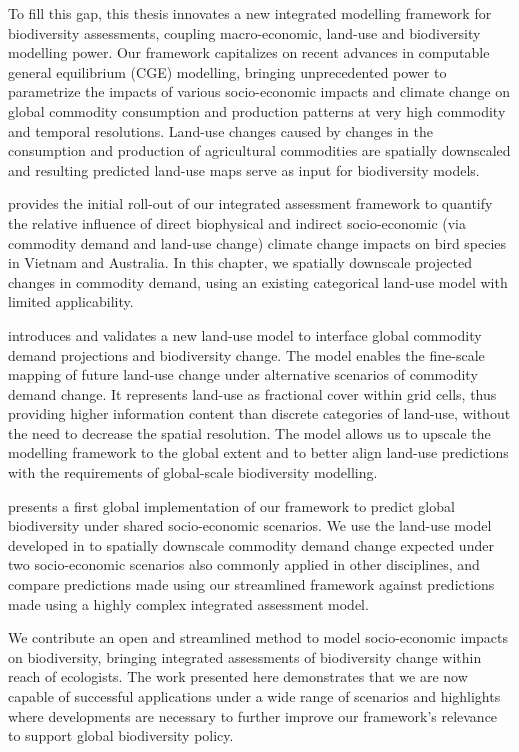 \documentclass[titlesmallcaps,copyrightpage]{uomthesis}\usepackage[]{graphicx}\usepackage[]{color}
\begin{document}
To fill this gap, this thesis innovates a new integrated modelling framework for biodiversity assessments, coupling macro-economic, land-use and biodiversity modelling power. Our framework capitalizes on recent advances in computable general equilibrium (CGE) modelling, bringing unprecedented power to parametrize the impacts of various socio-economic impacts and climate change on global commodity consumption and production patterns at very high commodity and temporal resolutions. Land-use changes caused by changes in the consumption and production of agricultural commodities are spatially downscaled and resulting predicted land-use maps serve as input for biodiversity models. 

 provides the initial roll-out of our integrated assessment framework to quantify the relative influence of direct biophysical and indirect socio-economic (via commodity demand and land-use change) climate change impacts on bird species in Vietnam and Australia. In this chapter, we spatially downscale projected changes in commodity demand, using an existing categorical land-use model with limited applicability. 

 introduces and validates a new land-use model to interface global commodity demand projections and biodiversity change. The model enables the fine-scale mapping of future land-use change under alternative scenarios of commodity demand change. It represents land-use as fractional cover within grid cells, thus providing higher information content than discrete categories of land-use, without the need to decrease the spatial resolution. The model allows us to upscale the modelling framework to the global extent and to better align land-use predictions with the requirements of global-scale biodiversity modelling. 

 presents a first global implementation of our framework to predict global biodiversity under shared socio-economic scenarios. We use the land-use model developed in  to spatially downscale commodity demand change expected under two socio-economic scenarios also commonly applied in other disciplines, and compare predictions made using our streamlined framework against predictions made using a highly complex integrated assessment model. 

We contribute an open and streamlined method to model socio-economic impacts on biodiversity, bringing integrated assessments of biodiversity change within reach of ecologists. The work presented here demonstrates that we are now capable of successful applications under a wide range of scenarios and highlights where developments are necessary to further improve our framework's relevance to support global biodiversity policy.
\end{document}
